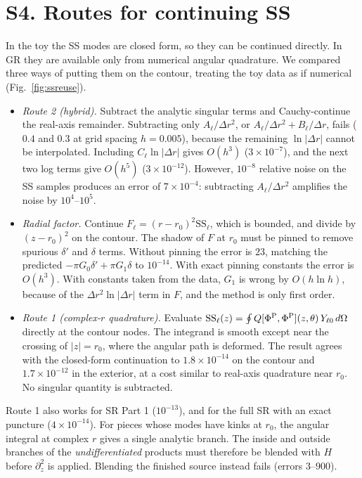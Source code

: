 \documentclass[aps,prl,onecolumn,superscriptaddress,nofootinbib,floatfix]{revtex4-2}
\newcommand{\PhiP}{\Phi^{\rm P}}
\begin{document}
\section{S4. Routes for continuing SS}
In the toy the SS modes are closed form, so they can be continued directly.
In GR they are available only from numerical angular quadrature.
We compared three ways of putting them on the contour, treating the toy data as if numerical (Fig.~\ref{fig:ssreuse}).
\begin{itemize}
\item \emph{Route 2 (hybrid).} Subtract the analytic singular terms and Cauchy-continue the real-axis remainder.
  Subtracting only $A_\ell/\Delta r^2$, or $A_\ell/\Delta r^2+B_\ell/\Delta r$, fails ($0.4$ and $0.3$ at grid spacing $h=0.005$), because the remaining $\ln|\Delta r|$ cannot be interpolated.
  Including $C_\ell\ln|\Delta r|$ gives $O(h^3)$ ($3\times10^{-7}$), and the next two log terms give $O(h^5)$ ($3\times10^{-12}$).
  However, $10^{-8}$ relative noise on the SS samples produces an error of $7\times10^{-4}$: subtracting $A_\ell/\Delta r^2$ amplifies the noise by $10^4$--$10^5$.
\item \emph{Radial factor.} Continue $F_\ell=(r-r_0)^2\mathrm{SS}_\ell$, which is bounded, and divide by $(z-r_0)^2$ on the contour.
  The shadow of $F$ at $r_0$ must be pinned to remove spurious $\delta'$ and $\delta$ terms. Without pinning the error is $23$, matching the predicted $-\pi G_0\delta'+\pi G_1\delta$ to $10^{-14}$.
  With exact pinning constants the error is $O(h^3)$. With constants taken from the data, $G_1$ is wrong by $O(h\ln h)$, because of the $\Delta r^2\ln|\Delta r|$ term in $F$, and the method is only first order.
\item \emph{Route 1 (complex-$r$ quadrature).} Evaluate $\mathrm{SS}_\ell(z)=\oint Q[\PhiP,\PhiP](z,\theta)\,Y_{\ell0}\,d\Omega$ directly at the contour nodes.
  The integrand is smooth except near the crossing of $|z|=r_0$, where the angular path is deformed.
  The result agrees with the closed-form continuation to $1.8\times10^{-14}$ on the contour and $1.7\times10^{-12}$ in the exterior, at a cost similar to real-axis quadrature near $r_0$.
  No singular quantity is subtracted.
\end{itemize}
Route 1 also works for SR Part 1 ($10^{-13}$), and for the full SR with an exact puncture ($4\times10^{-14}$).
For pieces whose modes have kinks at $r_0$, the angular integral at complex $r$ gives a single analytic branch.
The inside and outside branches of the \emph{undifferentiated} products must therefore be blended with $H$ before $\partial_z^2$ is applied. Blending the finished source instead fails (errors $3$--$900$).
\end{document}
